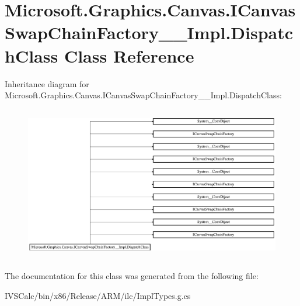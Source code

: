 \hypertarget{class_microsoft_1_1_graphics_1_1_canvas_1_1_i_canvas_swap_chain_factory_____impl_1_1_dispatch_class}{}\section{Microsoft.\+Graphics.\+Canvas.\+I\+Canvas\+Swap\+Chain\+Factory\+\_\+\+\_\+\+Impl.\+Dispatch\+Class Class Reference}
\label{class_microsoft_1_1_graphics_1_1_canvas_1_1_i_canvas_swap_chain_factory_____impl_1_1_dispatch_class}
Inheritance diagram for Microsoft.\+Graphics.\+Canvas.\+I\+Canvas\+Swap\+Chain\+Factory\+\_\+\+\_\+\+Impl.\+Dispatch\+Class\+:\begin{figure}[H]
\begin{center}
\leavevmode
\includegraphics[height=6.799117cm]{class_microsoft_1_1_graphics_1_1_canvas_1_1_i_canvas_swap_chain_factory_____impl_1_1_dispatch_class}
\end{center}
\end{figure}


The documentation for this class was generated from the following file\+:\begin{DoxyCompactItemize}
\item 
I\+V\+S\+Calc/bin/x86/\+Release/\+A\+R\+M/ilc/Impl\+Types.\+g.\+cs\end{DoxyCompactItemize}
